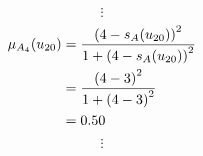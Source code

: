 \documentclass[a4paper]{book}
\begin{document}
				\[
					\vdots
				\]
				\begin{align}
					\mu_{A_4}(u_{20}) &= \frac{\left(4-s_A(u_{20})\right)^2}{1 + \left(4-s_A(u_{20})\right)^2}\\
					&= \frac{\left(4-3\right)^2}{1 + \left(4-3\right)^2} \notag \\
					&= 0.50 \notag
				\end{align}
				\[
					\vdots
				\]
\end{document}
